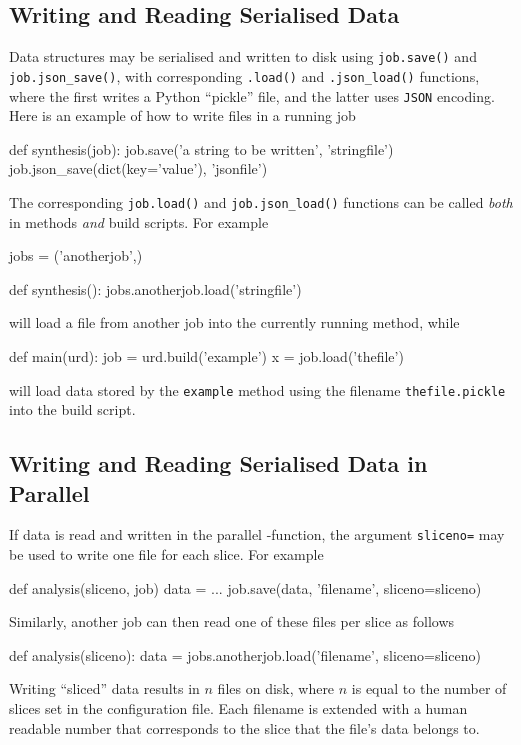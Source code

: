 \subsection{Writing and Reading Serialised Data}
Data structures may be serialised and written to disk using
\texttt{job.save()} and \texttt{job.json\_save()}, with corresponding
\texttt{.load()} and \texttt{.json\_load()} functions, where the first writes a
Python ``pickle'' file, and the latter uses \texttt{JSON} encoding.
Here is an example of how to write files in a running job
\begin{python}
def synthesis(job):
   job.save('a string to be written', 'stringfile')
   job.json_save(dict(key='value'), 'jsonfile')
\end{python}
The corresponding \texttt{job.load()} and \texttt{job.json\_load()}
functions can be called \textsl{both} in methods \textsl{and} build
scripts.  For example
\begin{python}
jobs = ('anotherjob',)

def synthesis():
    jobs.anotherjob.load('stringfile')
\end{python}
will load a file from another job into the currently running method, while
\begin{python}
def main(urd):
    job = urd.build('example')
    x = job.load('thefile')
\end{python}
will load data stored by the \texttt{example} method using the
filename \texttt{thefile.pickle} into the build script.


\subsection{Writing and Reading Serialised Data in Parallel}
\label{sec:sliced_files}
If data is read and written in the parallel \analysis-function, the
argument \texttt{sliceno=} may be used to write one file for each
slice.  For example
\begin{python}
def analysis(sliceno, job)
    data = ...
    job.save(data, 'filename', sliceno=sliceno)
\end{python}
Similarly, another job can then read one of these files per slice as follows
\begin{python}

def analysis(sliceno):
    data = jobs.anotherjob.load('filename', sliceno=sliceno)
\end{python}
Writing ``sliced'' data results in $n$ files on disk, where $n$ is
equal to the number of slices set in the configuration file.  Each
filename is extended with a human readable number that corresponds to
the slice that the file's data belongs to.



